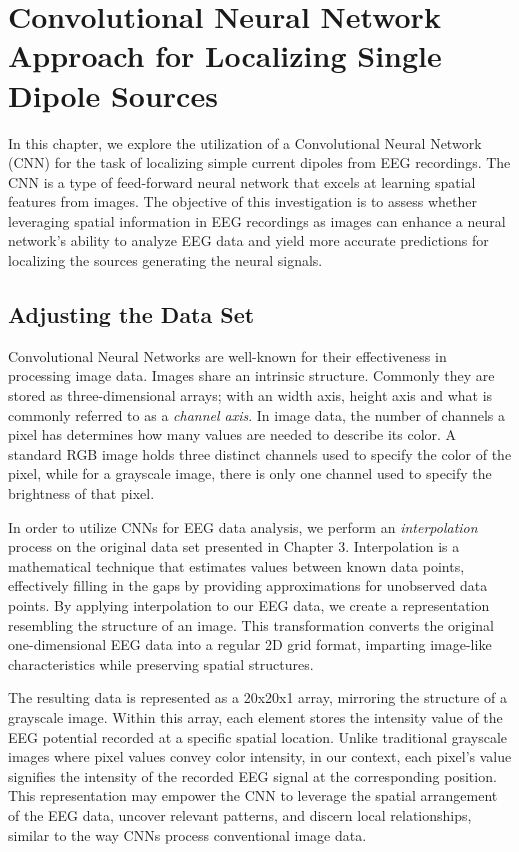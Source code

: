 \documentclass[a4paper, UKenglish, 11pt]{uiomaster}
\begin{document}
\chapter{Convolutional Neural Network Approach for Localizing Single Dipole Sources} \label{chap:simple_dipole_CNN}
In this chapter, we explore the utilization of a Convolutional Neural Network (CNN) for the task of localizing simple current dipoles from EEG recordings. The CNN is a type of feed-forward neural network that excels at learning spatial features from images. The objective of this investigation is to assess whether leveraging spatial information in EEG recordings as images can enhance a neural network's ability to analyze EEG data and yield more accurate predictions for localizing the sources generating the neural signals.

\section{Adjusting the Data Set}
Convolutional Neural Networks are well-known for their effectiveness in processing image data. Images share an intrinsic structure. Commonly they are stored as three-dimensional arrays; with an width axis, height axis and what is commonly referred to as a \emph{channel axis}. In image data, the number of channels a pixel has determines how many values are needed to describe its color. A standard RGB image holds three distinct channels used to specify the color of the pixel, while for a grayscale image, there is only one channel used to specify the brightness of that pixel.

In order to utilize CNNs for EEG data analysis, we perform an \emph{interpolation} process on the original data set presented in Chapter 3. Interpolation is a mathematical technique that estimates values between known data points, effectively filling in the gaps by providing approximations for unobserved data points. By applying interpolation to our EEG data, we create a representation resembling the structure of an image. This transformation converts the original one-dimensional EEG data into a regular 2D grid format, imparting image-like characteristics while preserving spatial structures.

The resulting data is represented as a 20x20x1 array, mirroring the structure of a grayscale image. Within this array, each element stores the intensity value of the EEG potential recorded at a specific spatial location. Unlike traditional grayscale images where pixel values convey color intensity, in our context, each pixel's value signifies the intensity of the recorded EEG signal at the corresponding position. This representation may empower the CNN to leverage the spatial arrangement of the EEG data, uncover relevant patterns, and discern local relationships, similar to the way CNNs process conventional image data.
\end{document}

